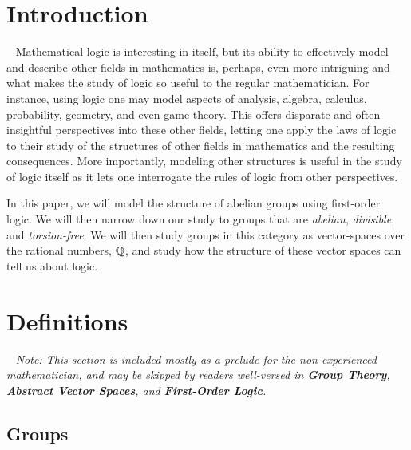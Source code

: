 \section{Introduction}~\label{sec:prelims}
Mathematical logic is interesting in itself, but
its ability to effectively model and describe other
fields in mathematics is, perhaps, even more intriguing
and what makes the study of logic so useful to the regular
mathematician.
For instance, using logic one may model aspects of
analysis, algebra, calculus, probability, geometry,
and even game theory.
This offers disparate and often insightful perspectives into these other fields,
letting one apply the laws of logic to their study of the structures
of other fields in mathematics and the resulting consequences.
More importantly, modeling other structures is useful in the study of logic
itself as it lets one interrogate the rules of logic from other perspectives.

In this paper, we will model the structure of abelian groups using
first-order logic. We will then narrow down our study to groups that
are \emph{abelian}, \emph{divisible}, and \emph{torsion-free}.
We will then study groups in this category as vector-spaces
over the rational numbers, $\mathbb{Q}$, and study how the structure of these
vector spaces can tell us about logic.

\section{Definitions}~\label{sec:definitions}
\emph{
  Note: This section is included mostly as a prelude for the
  non-experienced mathematician, and may be skipped by readers
  well-versed in
  \textbf{Group Theory},
  \textbf{Abstract Vector Spaces},
  and \textbf{First-Order Logic}.
}

\subsection{Groups}~\label{sec:def-groups}

